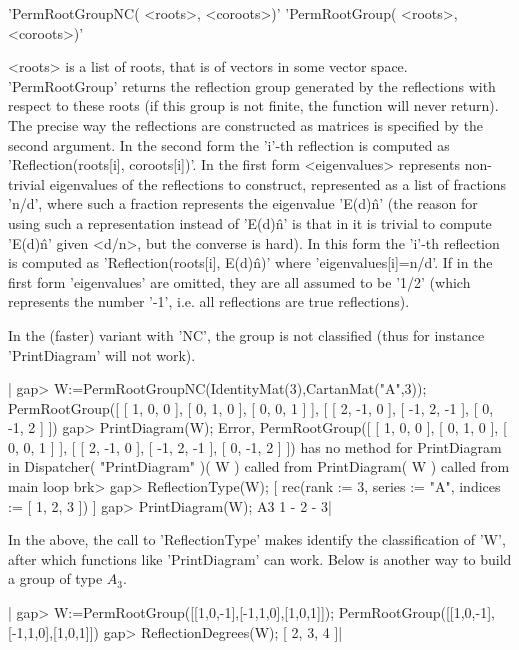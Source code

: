 'PermRootGroupNC( <roots>, <coroots>)'
'PermRootGroup( <roots>, <coroots>)'

<roots>  is  a  list  of  roots,  that  is of vectors in some vector space.
'PermRootGroup'  returns the reflection group  generated by the reflections
with respect to these roots (if this group is not finite, the function will
never  return). The precise way the reflections are constructed as matrices
is  specified  by  the  second  argument.  In  the  second  form the 'i'-th
reflection  is computed as 'Reflection(roots[i], coroots[i])'. In the first
form <eigenvalues> represents non-trivial eigenvalues of the reflections to
construct,  represented as a list of fractions 'n/d', where such a fraction
represents   the  eigenvalue  'E(d)\^n'  (the   reason  for  using  such  a
representation  instead of  'E(d)\^n' is  that in  {\GAP} it  is trivial to
compute  'E(d)\^n' given <d/n>, but the converse is hard). In this form the
'i'-th  reflection  is  computed  as  'Reflection(roots[i], E(d)\^n)' where
'eigenvalues[i]=n/d'.  If in the first form 'eigenvalues' are omitted, they
are  all assumed to  be '1/2' (which  represents the number  '-1', i.e. all
reflections are true reflections).

In  the (faster) variant with  'NC', the group is  not classified (thus for
instance 'PrintDiagram' will not work).

|    gap> W:=PermRootGroupNC(IdentityMat(3),CartanMat("A",3));
    PermRootGroup([ [ 1, 0, 0 ], [ 0, 1, 0 ], [ 0, 0, 1 ] ],
      [ [ 2, -1, 0 ], [ -1, 2, -1 ], [ 0, -1, 2 ] ])
    gap> PrintDiagram(W);
    Error, PermRootGroup([ [ 1, 0, 0 ], [ 0, 1, 0 ], [ 0, 0, 1 ] ],
      [ [ 2, -1, 0 ], [ -1, 2, -1 ], [ 0, -1, 2 ] ]) has no method 
    for PrintDiagram in
    Dispatcher( "PrintDiagram" )( W ) called from
    PrintDiagram( W ) called from
    main loop
    brk> 
    gap> ReflectionType(W);
    [ rec(rank    := 3,
          series  := "A",
          indices := [ 1, 2, 3 ]) ]
    gap> PrintDiagram(W);
    A3 1 - 2 - 3|

In the above, the call  to 'ReflectionType' makes {\CHEVIE} identify the
classification  of 'W',  after which  functions like  'PrintDiagram' can
work. Below is another way to build a group of type $A_3$.

|    gap> W:=PermRootGroup([[1,0,-1],[-1,1,0],[1,0,1]]);
    PermRootGroup([[1,0,-1],[-1,1,0],[1,0,1]])
    gap> ReflectionDegrees(W);
    [ 2, 3, 4 ]|

%
%

